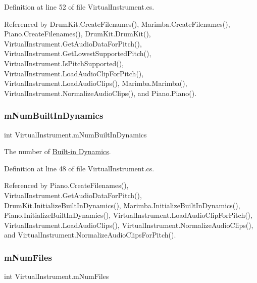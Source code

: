 Definition at line 52 of file Virtual\+Instrument.\+cs.



Referenced by Drum\+Kit.\+Create\+Filenames(), Marimba.\+Create\+Filenames(), Piano.\+Create\+Filenames(), Drum\+Kit.\+Drum\+Kit(), Virtual\+Instrument.\+Get\+Audio\+Data\+For\+Pitch(), Virtual\+Instrument.\+Get\+Lowest\+Supported\+Pitch(), Virtual\+Instrument.\+Is\+Pitch\+Supported(), Virtual\+Instrument.\+Load\+Audio\+Clip\+For\+Pitch(), Virtual\+Instrument.\+Load\+Audio\+Clips(), Marimba.\+Marimba(), Virtual\+Instrument.\+Normalize\+Audio\+Clips(), and Piano.\+Piano().

\mbox{\label{group___v_i_base_pro_var_gac265f64f759d267ee1e1680f8d387011}} 
\subsubsection{\texorpdfstring{m\+Num\+Built\+In\+Dynamics}{mNumBuiltInDynamics}}
{\footnotesize\ttfamily int Virtual\+Instrument.\+m\+Num\+Built\+In\+Dynamics\hspace{0.3cm}{\ttfamily [protected]}}



The number of \hyperlink{group___audio_DefBID}{Built-\/in Dynamics}. 



Definition at line 48 of file Virtual\+Instrument.\+cs.



Referenced by Piano.\+Create\+Filenames(), Virtual\+Instrument.\+Get\+Audio\+Data\+For\+Pitch(), Drum\+Kit.\+Initialize\+Built\+In\+Dynamics(), Marimba.\+Initialize\+Built\+In\+Dynamics(), Piano.\+Initialize\+Built\+In\+Dynamics(), Virtual\+Instrument.\+Load\+Audio\+Clip\+For\+Pitch(), Virtual\+Instrument.\+Load\+Audio\+Clips(), Virtual\+Instrument.\+Normalize\+Audio\+Clips(), and Virtual\+Instrument.\+Normalize\+Audio\+Clips\+For\+Pitch().

\mbox{\label{group___v_i_base_pro_var_ga9a602db8c9833ce75d95dd453c27d341}} 
\subsubsection{\texorpdfstring{m\+Num\+Files}{mNumFiles}}
{\footnotesize\ttfamily int Virtual\+Instrument.\+m\+Num\+Files\hspace{0.3cm}{\ttfamily [protected]}}



